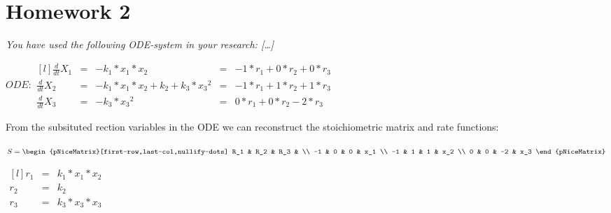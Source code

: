 \documentclass[]{scrartcl}
\begin{document}
\vspace{12pt}

\section*{Homework 2}


\textit{You have used the following ODE-system in your research: [\dots]}
\vspace{12pt}


\begin{center}
\noindent \begin{minipage}{.8\linewidth}
$
ODE: 
\begin{matrix*}[l]
	\frac{d}{dt} X_1 & = & - k_1 * x_1 * x_2						& = & - 1 * r_1 + 0 * r_2 + 0 * r_3 \\ 
	\frac{d}{dt} X_2 & = & - k_1 * x_1 * x_2 + k_2 + k_3 * {x_3}^2  & = & - 1 * r_1 + 1 * r_2 + 1 * r_3 \\
	\frac{d}{dt} X_3 & = & - k_3 * {x_3}^2 							& = &   0 * r_1 + 0 * r_2 - 2 * r_3
\end{matrix*}
$
\end{minipage}
\end{center}


\vspace{12pt}
From the subsituted rection variables in the ODE we can reconstruct the stoichiometric matrix and rate functions: 
\vspace{12pt}




\begin{center}
\noindent \begin{minipage}{.4\linewidth}
$
S =
\begin{pNiceMatrix}[first-row,last-col,nullify-dots]
	R_1	&	R_2 &	R_3 &	 \\
	 -1 &	  0 &	  0 &	x_1 \\
	 -1 &	  1 &	  1 &	x_2 \\
	  0	&	  0 &	 -2 &	x_3
\end{pNiceMatrix}
$
\end{minipage}
\noindent \begin{minipage}{.4\linewidth}
$
\begin{matrix*}[l]
	r_1 & = & k_1 * x_1 * x_2 \\
	r_2 & = & k_2 \\
	r_3 & = & k_3 * x_3 * x_3 \\
\end{matrix*}
$
\end{minipage}
\end{center}
\end{document}
